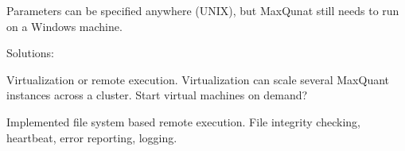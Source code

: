 Parameters can be specified anywhere (UNIX), but
MaxQunat still needs to run on a Windows machine.

Solutions:

Virtualization or remote execution. Virtualization can
scale several MaxQuant instances across a cluster. Start virtual
machines on demand?

Implemented file system based remote execution. File integrity checking,
heartbeat, error reporting, logging.

\vspace{10cm}
